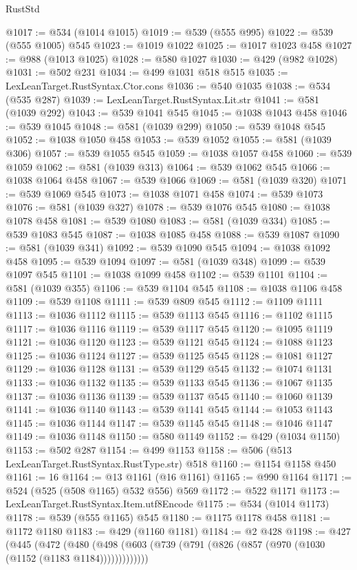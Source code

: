 \begin{lexlean}{RustStd}
\begin{coremodule}
@1017 := @534 (@1014 @1015)
@1019 := @539 (@555 @995)
@1022 := @539 (@555 @1005) @545
@1023 := @1019 @1022
@1025 := @1017 @1023 @458
@1027 := @988 (@1013 @1025)
@1028 := @580 @1027
@1030 := @429 (@982 @1028)
@1031 := @502 @231
@1034 := @499 @1031 @518 @515
@1035 := LexLeanTarget.RustSyntax.Ctor.cons
@1036 := @540 @1035
@1038 := @534 (@535 @287)
@1039 := LexLeanTarget.RustSyntax.Lit.str
@1041 := @581 (@1039 @292)
@1043 := @539 @1041 @545
@1045 := @1038 @1043 @458
@1046 := @539 @1045
@1048 := @581 (@1039 @299)
@1050 := @539 @1048 @545
@1052 := @1038 @1050 @458
@1053 := @539 @1052
@1055 := @581 (@1039 @306)
@1057 := @539 @1055 @545
@1059 := @1038 @1057 @458
@1060 := @539 @1059
@1062 := @581 (@1039 @313)
@1064 := @539 @1062 @545
@1066 := @1038 @1064 @458
@1067 := @539 @1066
@1069 := @581 (@1039 @320)
@1071 := @539 @1069 @545
@1073 := @1038 @1071 @458
@1074 := @539 @1073
@1076 := @581 (@1039 @327)
@1078 := @539 @1076 @545
@1080 := @1038 @1078 @458
@1081 := @539 @1080
@1083 := @581 (@1039 @334)
@1085 := @539 @1083 @545
@1087 := @1038 @1085 @458
@1088 := @539 @1087
@1090 := @581 (@1039 @341)
@1092 := @539 @1090 @545
@1094 := @1038 @1092 @458
@1095 := @539 @1094
@1097 := @581 (@1039 @348)
@1099 := @539 @1097 @545
@1101 := @1038 @1099 @458
@1102 := @539 @1101
@1104 := @581 (@1039 @355)
@1106 := @539 @1104 @545
@1108 := @1038 @1106 @458
@1109 := @539 @1108
@1111 := @539 @809 @545
@1112 := @1109 @1111
@1113 := @1036 @1112
@1115 := @539 @1113 @545
@1116 := @1102 @1115
@1117 := @1036 @1116
@1119 := @539 @1117 @545
@1120 := @1095 @1119
@1121 := @1036 @1120
@1123 := @539 @1121 @545
@1124 := @1088 @1123
@1125 := @1036 @1124
@1127 := @539 @1125 @545
@1128 := @1081 @1127
@1129 := @1036 @1128
@1131 := @539 @1129 @545
@1132 := @1074 @1131
@1133 := @1036 @1132
@1135 := @539 @1133 @545
@1136 := @1067 @1135
@1137 := @1036 @1136
@1139 := @539 @1137 @545
@1140 := @1060 @1139
@1141 := @1036 @1140
@1143 := @539 @1141 @545
@1144 := @1053 @1143
@1145 := @1036 @1144
@1147 := @539 @1145 @545
@1148 := @1046 @1147
@1149 := @1036 @1148
@1150 := @580 @1149
@1152 := @429 (@1034 @1150)
@1153 := @502 @287
@1154 := @499 @1153
@1158 := @506 (@513 LexLeanTarget.RustSyntax.RustType.str) @518
@1160 := @1154 @1158 @450
@1161 := 16
@1164 := @13 @1161 (@16 @1161)
@1165 := @990 @1164
@1171 := @524 (@525 (@508 @1165) @532 @556) @569
@1172 := @522 @1171
@1173 := LexLeanTarget.RustSyntax.Item.utf8Encode
@1175 := @534 (@1014 @1173)
@1178 := @539 (@555 @1165) @545
@1180 := @1175 @1178 @458
@1181 := @1172 @1180
@1183 := @429 (@1160 @1181)
@1184 := @2 @428
@1198 := @427
    (@445
      (@472 (@480 (@498 (@603 (@739 (@791 (@826 (@857 (@970 (@1030 (@1152 (@1183 @1184)))))))))))))

\end{coremodule}
\end{lexlean}
